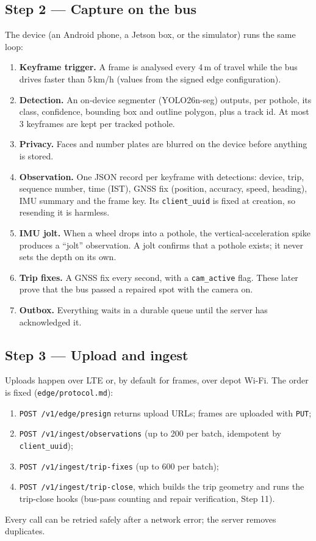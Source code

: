 \documentclass[11pt,a4paper]{article}
\newcommand{\code}[1]{\texttt{\small #1}}
\begin{document}
\subsection{Step 2 --- Capture on the bus}
The device (an Android phone, a Jetson box, or the simulator) runs the same loop:
\begin{enumerate}
  \item \textbf{Keyframe trigger.} A frame is analysed every 4\,m of travel while the bus drives faster than
        5\,km/h (values from the signed edge configuration).
  \item \textbf{Detection.} An on-device segmenter (YOLO26n-seg) outputs, per pothole, its class, confidence,
        bounding box and outline polygon, plus a track id. At most 3 keyframes are kept per tracked pothole.
  \item \textbf{Privacy.} Faces and number plates are blurred on the device before anything is stored.
  \item \textbf{Observation.} One JSON record per keyframe with detections: device, trip, sequence number, time
        (IST), GNSS fix (position, accuracy, speed, heading), IMU summary and the frame key. Its
        \code{client\_uuid} is fixed at creation, so resending it is harmless.
  \item \textbf{IMU jolt.} When a wheel drops into a pothole, the vertical-acceleration spike produces a
        ``jolt'' observation. A jolt confirms that a pothole exists; it never sets the depth on its own.
  \item \textbf{Trip fixes.} A GNSS fix every second, with a \code{cam\_active} flag. These later prove that the
        bus passed a repaired spot with the camera on.
  \item \textbf{Outbox.} Everything waits in a durable queue until the server has acknowledged it.
\end{enumerate}

\subsection{Step 3 --- Upload and ingest}
Uploads happen over LTE or, by default for frames, over depot Wi-Fi. The order is fixed (\code{edge/protocol.md}):
\begin{enumerate}
  \item \code{POST /v1/edge/presign} returns upload URLs; frames are uploaded with \code{PUT};
  \item \code{POST /v1/ingest/observations} (up to 200 per batch, idempotent by \code{client\_uuid});
  \item \code{POST /v1/ingest/trip-fixes} (up to 600 per batch);
  \item \code{POST /v1/ingest/trip-close}, which builds the trip geometry and runs the trip-close hooks
        (bus-pass counting and repair verification, Step 11).
\end{enumerate}
Every call can be retried safely after a network error; the server removes duplicates.
\end{document}
